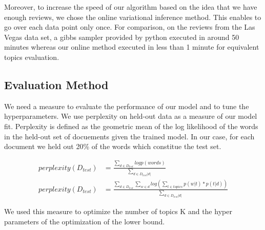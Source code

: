 \documentclass[paper=a4, fontsize=11pt]{scrartcl} %
\numberwithin{equation}{section}
\numberwithin{figure}{section}
\numberwithin{table}{section}
\begin{document}
Moreover, to increase the speed of our algorithm based on the idea that we have enough reviews, we chose the online variational inference method. This enables to go over each data point only once. For comparison, on the reviews from the Las Vegas data set, a gibbs sampler provided by python executed in around 50 minutes whereas our online method executed in less than 1 minute for equivalent topics evaluation.

\subsection*{Evaluation Method}

We need a measure to evaluate the performance of our model and to tune the hyperparameters. We use perplexity on held-out data as a measure of our model fit. Perplexity is defined as the geometric mean of the log likelihood of the words in the held-out set of docuements given the trained model. In our case, for each document we held out 20\% of the words which constitue the test set.

\begin{align*}
	perplexity(D_{test}) & = \frac{\sum_{d \in D_{test}} log p(words)}{\sum_{d \in D_{test}|d|}}\\
	perplexity(D_{test}) & = \frac{\sum_{d \in D_{test}} \sum_{w \in d} log \left( \sum_{t \in topics} p(w|t) * p(t|d) \right)}{\sum_{d \in D_{test}|d|}}
\end{align*}

We used this measure to optimize the number of topics K and the hyper parameters of the optimization of the lower bound.
\end{document}
